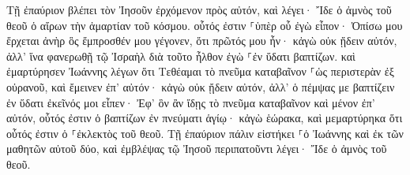 \documentclass{openreader}
\begin{document}
Τῇ ἐπαύριον βλέπει τὸν Ἰησοῦν ἐρχόμενον πρὸς αὐτόν, καὶ λέγει· Ἴδε ὁ ἀμνὸς τοῦ θεοῦ ὁ αἴρων τὴν ἁμαρτίαν τοῦ κόσμου. 
οὗτός ἐστιν ⸀ὑπὲρ οὗ ἐγὼ εἶπον· Ὀπίσω μου ἔρχεται ἀνὴρ ὃς ἔμπροσθέν μου γέγονεν, ὅτι πρῶτός μου ἦν· 
κἀγὼ οὐκ ᾔδειν αὐτόν, ἀλλ’ ἵνα φανερωθῇ τῷ Ἰσραὴλ διὰ τοῦτο ἦλθον ἐγὼ ⸀ἐν ὕδατι βαπτίζων. 
καὶ ἐμαρτύρησεν Ἰωάννης λέγων ὅτι Τεθέαμαι τὸ πνεῦμα καταβαῖνον ⸀ὡς περιστερὰν ἐξ οὐρανοῦ, καὶ ἔμεινεν ἐπ’ αὐτόν· 
κἀγὼ οὐκ ᾔδειν αὐτόν, ἀλλ’ ὁ πέμψας με βαπτίζειν ἐν ὕδατι ἐκεῖνός μοι εἶπεν· Ἐφ’ ὃν ἂν ἴδῃς τὸ πνεῦμα καταβαῖνον καὶ μένον ἐπ’ αὐτόν, οὗτός ἐστιν ὁ βαπτίζων ἐν πνεύματι ἁγίῳ· 
κἀγὼ ἑώρακα, καὶ μεμαρτύρηκα ὅτι οὗτός ἐστιν ὁ ⸀ἐκλεκτὸς τοῦ θεοῦ. 
Τῇ ἐπαύριον πάλιν εἱστήκει ⸀ὁ Ἰωάννης καὶ ἐκ τῶν μαθητῶν αὐτοῦ δύο, 
καὶ ἐμβλέψας τῷ Ἰησοῦ περιπατοῦντι λέγει· Ἴδε ὁ ἀμνὸς τοῦ θεοῦ. 
\end{document}
